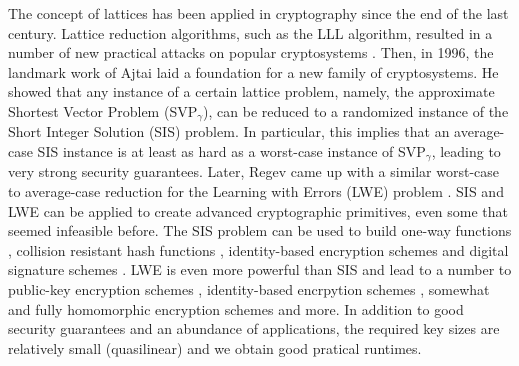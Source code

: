 \documentclass[
  a4paper,  %
  twoside,  %
  bibliography=totoc,
  headsepline,
  cleardoublepage=empty,
  parskip=half,
  draft=false
]{scrbook}
\begin{document}
The concept of lattices has been applied in cryptography since the end of the last century. Lattice reduction algorithms, such as the LLL algorithm, resulted in a number of new practical attacks on popular cryptosystems \cite{NV10}. Then, in 1996, the landmark work of Ajtai \cite{Ajt96} laid a foundation for a new family of cryptosystems. He showed that any instance of a certain lattice problem, namely, the approximate Shortest Vector Problem (SVP$_\gamma$), can be reduced to a randomized instance of the Short Integer Solution (SIS) problem. In particular, this implies that an average-case SIS instance is at least as hard as a worst-case instance of SVP$_\gamma$, leading to very strong security guarantees. Later, Regev came up with a similar worst-case to average-case reduction for the Learning with Errors (LWE) problem \cite{Reg05}. SIS and LWE can be applied to create advanced cryptographic primitives, even some that seemed infeasible before. The SIS problem can be used to build one-way functions \cite{Ajt96, MR04}, collision resistant hash functions \cite{GGH96}, identity-based encryption schemes \cite{Lyu08} and digital signature schemes \cite{LM08, GPV08}. LWE is even more powerful than SIS and lead to a number to public-key encryption schemes \cite{Reg05, PW08, LPR10}, identity-based encrpytion schemes \cite{GPV08, ABB10}, somewhat and fully homomorphic encryption schemes \cite{Gen09a,BV11,GSW13} and more.
In addition to good security guarantees and an abundance of applications, the required key sizes are relatively small (quasilinear) and we obtain good pratical runtimes.

%

\end{document}
